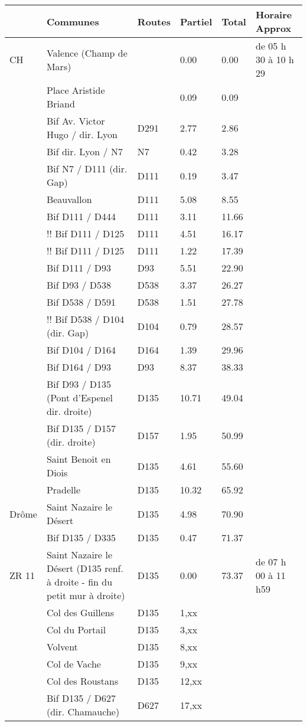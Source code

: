 \documentclass{article}%
\begin{document}
\begin{longtable}{p{2.25cm}|p{7.0cm}|p{1.5cm}|p{1.5cm}|p{1.5cm}|p{3.5cm}}%
\hline%
&Communes&Routes&Partiel&Total&Horaire Approx\\%
\hline%
\endhead%
\endfoot%
\endlastfoot%
﻿CH& Valence (Champ de Mars) &&0.00&0.00&de 05 h 30 à 10 h 29\\%
&Place Aristide Briand &&0.09&0.09&\\%
&Bif Av. Victor Hugo / dir. Lyon&D291&2.77&2.86&\\%
&Bif dir. Lyon / N7&N7 &0.42&3.28&\\%
&Bif N7 / D111 (dir. Gap)&D111&0.19&3.47&\\%
&Beauvallon &D111&5.08&8.55&\\%
&Bif D111 / D444 &D111&3.11&11.66&\\%
&!! Bif D111 / D125&D111&4.51&16.17&\\%
&!! Bif D111 / D125&D111&1.22&17.39&\\%
&Bif D111 / D93&D93&5.51&22.90&\\%
&Bif D93 / D538&D538&3.37&26.27&\\%
&Bif D538 / D591 &D538&1.51&27.78&\\%
&!! Bif D538 / D104 (dir. Gap) &D104&0.79&28.57&\\%
&Bif D104 / D164 &D164&1.39&29.96&\\%
&Bif D164 / D93&D93&8.37&38.33&\\%
&Bif D93 / D135 (Pont d'Espenel dir. droite)&D135 &10.71&49.04&\\%
&Bif D135 / D157 (dir. droite)&D157&1.95&50.99&\\%
&Saint Benoit en Diois&D135&4.61&55.60&\\%
&Pradelle&D135&10.32&65.92&\\%
Drôme &Saint Nazaire le Désert&D135&4.98&70.90&\\%
&Bif D135 / D335&D135&0.47&71.37&\\%
 ZR 11 &Saint Nazaire le Désert (D135 renf. à droite {-} fin du petit mur à droite)&D135&0.00&73.37&de 07 h 00 à 11 h59\\%
&Col des Guillens&D135&1,xx&&\\%
&Col du Portail&D135&3,xx&&\\%
&Volvent&D135&8,xx&&\\%
&Col de Vache &D135&9,xx&&\\%
&Col des Roustans&D135&12,xx&&\\%
&Bif D135 / D627 (dir. Chamauche)&D627&17,xx&&\\%

\end{longtable}
\end{document}
